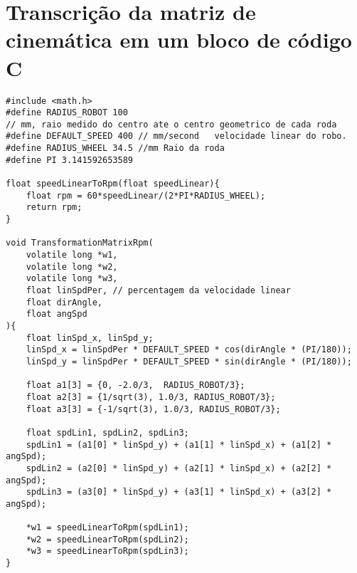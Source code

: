 

\chapter{Transcrição da matriz de cinemática em um bloco de código C}

\lstset{language=C}
\begin{lstlisting}
#include <math.h>
#define RADIUS_ROBOT 100
// mm, raio medido do centro ate o centro geometrico de cada roda
#define DEFAULT_SPEED 400 // mm/second   velocidade linear do robo.
#define RADIUS_WHEEL 34.5 //mm Raio da roda
#define PI 3.141592653589

float speedLinearToRpm(float speedLinear){
    float rpm = 60*speedLinear/(2*PI*RADIUS_WHEEL);
    return rpm;
}

void TransformationMatrixRpm(
	volatile long *w1,
	volatile long *w2,
	volatile long *w3,
	float linSpdPer, // percentagem da velocidade linear
	float dirAngle,
	float angSpd
){
	float linSpd_x, linSpd_y;
	linSpd_x = linSpdPer * DEFAULT_SPEED * cos(dirAngle * (PI/180));
	linSpd_y = linSpdPer * DEFAULT_SPEED * sin(dirAngle * (PI/180));

	float a1[3] = {0, -2.0/3,  RADIUS_ROBOT/3};
	float a2[3] = {1/sqrt(3), 1.0/3, RADIUS_ROBOT/3};
	float a3[3] = {-1/sqrt(3), 1.0/3, RADIUS_ROBOT/3};

	float spdLin1, spdLin2, spdLin3;
	spdLin1 = (a1[0] * linSpd_y) + (a1[1] * linSpd_x) + (a1[2] * angSpd);
	spdLin2 = (a2[0] * linSpd_y) + (a2[1] * linSpd_x) + (a2[2] * angSpd);
	spdLin3 = (a3[0] * linSpd_y) + (a3[1] * linSpd_x) + (a3[2] * angSpd);
	
	*w1 = speedLinearToRpm(spdLin1);
	*w2 = speedLinearToRpm(spdLin2);
	*w3 = speedLinearToRpm(spdLin3);	
}
\end{lstlisting}